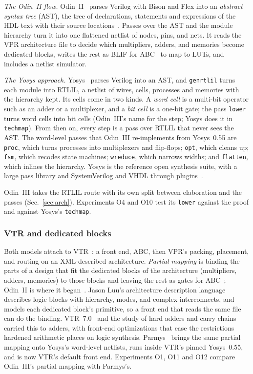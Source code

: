 \documentclass[conference]{IEEEtran}
\newcommand{\code}[1]{\texttt{#1}}
\begin{document}
\emph{The Odin~II flow.} Odin~II~ parses Verilog with Bison and Flex into an \emph{abstract syntax tree} (AST), the tree of declarations, statements and expressions of the HDL text with their source locations~.
Passes over the AST and the module hierarchy turn it into one flattened netlist of nodes, pins, and nets. It reads the VPR architecture file to decide which multipliers, adders, and memories become dedicated blocks, writes the rest as BLIF for ABC~ to map to LUTs, and includes a netlist simulator.

\emph{The Yosys approach.} Yosys~ parses Verilog into an AST, and \code{genrtlil} turns each module into RTLIL, a netlist of wires, cells, processes and memories with the hierarchy kept. Its cells come in two kinds. A \emph{word cell} is a multi-bit operator such as an adder or a multiplexer, and a \emph{bit cell} is a one-bit gate; the pass \code{lower} turns word cells into bit cells (Odin~III's name for the step; Yosys does it in \code{techmap}).
From then on, every step is a pass over RTLIL that never sees the AST. The word-level passes that Odin~III re-implements from Yosys~0.55 are \code{proc}, which turns processes into multiplexers and flip-flops; \code{opt}, which cleans up; \code{fsm}, which recodes state machines; \code{wreduce}, which narrows widths; and \code{flatten}, which inlines the hierarchy.
Yosys is the reference open synthesis suite, with a large pass library and SystemVerilog and VHDL through plugins~.

Odin~III takes the RTLIL route with its own split between elaboration and the passes (Sec.~\ref{sec:arch}). Experiments O4 and O10 test its \code{lower} against the proof and against Yosys's \code{techmap}.

\subsubsection*{VTR and dedicated blocks}

Both models attach to VTR~: a front end, ABC, then VPR's packing, placement, and routing on an XML-described architecture. \emph{Partial mapping} is binding the parts of a design that fit the dedicated blocks of the architecture (multipliers, adders, memories) to those blocks and leaving the rest as gates for ABC~; Odin~II is where it began~.
Jason Luu's architecture description language~ describes logic blocks with hierarchy, modes, and complex interconnects, and models each dedicated block's primitive, so a front end that reads the same file can do the binding. VTR~7.0~ and the study of hard adders and carry chains~ carried this to adders, with front-end optimizations that ease the restrictions hardened arithmetic places on logic synthesis. Parmys~ brings the same partial mapping onto Yosys's word-level netlists, runs inside VTR's pinned Yosys~0.55, and is now VTR's default front end. Experiments O1, O11 and O12 compare Odin~III's partial mapping with Parmys's.
\end{document}
